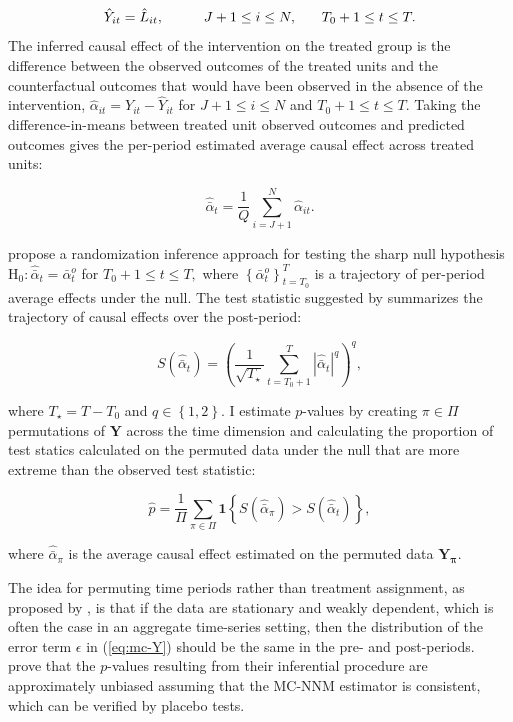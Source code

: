 \documentclass[12pt]{article}
\begin{document}
\[
\hat{Y}_{it} = \hat{L}_{it}, \hspace{10mm} J+1 \leq i \leq N, \, \hspace{5mm} \, T_0+1 \leq t \leq T.
\] The inferred causal effect of the intervention on the treated group is the difference between the observed outcomes of the treated units and the counterfactual outcomes that would have been observed in the absence of the intervention, 
$\hat{\alpha}_{it} = Y_{it} - \hat{Y}_{it}$ for $J+1 \leq i \leq N$ and $T_0+1 \leq t \leq T.$ Taking the difference-in-means between treated unit observed outcomes and predicted outcomes gives the per-period estimated average causal effect across treated units:

\begin{equation}
\hat{\bar{\alpha}}_{t}  = \frac{1}{Q} \sum^{N}_{i=J+1} \hat{\alpha}_{it}.  \label{eq:avg-pointwise}
\end{equation}

\noindent
\citet{chernozhukov2017exact} propose a randomization inference approach for testing the sharp null hypothesis $
\text{H}_0: \hat{\bar{\alpha}}_{t} = \bar{\alpha}^{o}_{t}$ for $T_0+1 \leq t \leq T,$
where $\left\{\bar{\alpha}^{o}_{t}\right\}_{t=T_0}^T$ is a trajectory of per-period average effects under the null. The test statistic suggested by \citet{chernozhukov2017exact} summarizes the trajectory of causal effects over the post-period:

\begin{equation} \label{tstat}
S (\hat{\bar{\alpha}}_{t}) = \left(\frac{1}{\sqrt{T_\star}} \sum_{t=T_0 +1}^{T} |\hat{\bar{\alpha}}_{t}|^q\right)^q,
\end{equation}

\noindent
where $T_\star = T-T_0$ and $q \in \left\{1, 2\right\}$. I estimate $p$-values by creating $\pi \in \Pi$ permutations of $\mathbf{Y}$ across the time dimension and calculating the proportion of test statics calculated on the permuted data under the null that are more extreme than the observed test statistic:

\begin{equation}
\hat{p} = \frac{1}{\Pi} \sum_{\pi \in \Pi} \textbf{1} \left\{S (\hat{\bar{\alpha}}_{\pi}) > S (\hat{\bar{\alpha}}_{t}) \right\}, \label{eq:pvalue}
\end{equation}

\noindent
where $\hat{\bar{\alpha}}_{\pi}$ is the average causal effect estimated on the permuted data $\mathbf{Y_\pi}$. 

The idea for permuting time periods rather than treatment assignment, as proposed by \citet{abadie2010synthetic}, is that if the data are stationary and weakly dependent, which is often the case in an aggregate time-series setting, then the distribution of the error term $\epsilon$ in (\ref{eq:mc-Y}) should be the same in the pre- and post-periods. \citet{chernozhukov2017exact} prove that the $p$-values resulting from their inferential procedure are approximately unbiased assuming that the MC-NNM estimator is consistent, which can be verified by placebo tests. 
\end{document}
